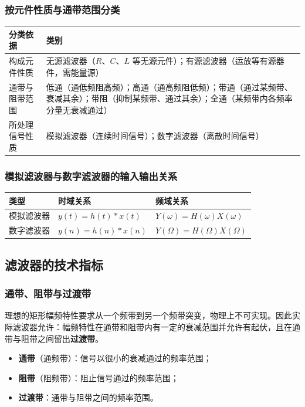 \subsubsection{按元件性质与通带范围分类}
\begin{center}
\small
\begin{tabular}{p{2.6cm}p{11.4cm}}
\toprule
分类依据 & 类别 \\
\midrule
构成元件性质 & 无源滤波器（$R$、$C$、$L$ 等无源元件）；有源滤波器（运放等有源器件，需能量源） \\
通带与阻带范围 & 低通（通低频阻高频）；高通（通高频阻低频）；带通（通过某频带、衰减其余）；带阻（抑制某频带、通过其余）；全通（某频带内各频率分量无衰减通过） \\
所处理信号性质 & 模拟滤波器（连续时间信号）；数字滤波器（离散时间信号） \\
\bottomrule
\end{tabular}
\end{center}

\subsubsection{模拟滤波器与数字滤波器的输入输出关系}
\begin{center}
\begin{tabular}{lll}
\toprule
类型 & 时域关系 & 频域关系 \\
\midrule
模拟滤波器 & $y(t)=h(t)*x(t)$ & $Y(\omega)=H(\omega)X(\omega)$ \\
数字滤波器 & $y(n)=h(n)*x(n)$ & $Y(\Omega)=H(\Omega)X(\Omega)$ \\
\bottomrule
\end{tabular}
\end{center}

\subsection{滤波器的技术指标}

\subsubsection{通带、阻带与过渡带}
理想的矩形幅频特性要求从一个频带到另一个频带突变，物理上不可实现。因此实际滤波器允许：幅频特性在通带和阻带内有一定的衰减范围并允许有起伏，且在通带与阻带之间留出\textbf{过渡带}。
\begin{itemize}
\item \textbf{通带}（通频带）：信号以很小的衰减通过的频率范围；
\item \textbf{阻带}（阻频带）：阻止信号通过的频率范围；
\item \textbf{过渡带}：通带与阻带之间的频率范围。
\end{itemize}

